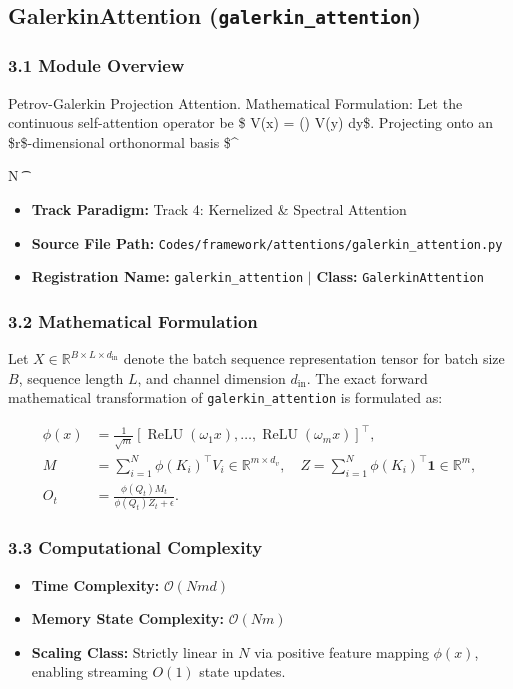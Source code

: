 \subsection{GalerkinAttention (\texttt{galerkin\_attention})}
\label{sec:app_module_galerkin_attention}

\subsubsection*{3.1 Module Overview}
Petrov-Galerkin Projection Attention.  Mathematical Formulation:     Let the continuous self-attention operator be \$ V(x) = \int {}\left(\right) V(y) dy\$.     Projecting onto an \$r\$-dimensional orthonormal basis \$\Phi \in {}^{N \t
\begin{itemize}
    \item \textbf{Track Paradigm:} Track 4: Kernelized & Spectral Attention
    \item \textbf{Source File Path:} \texttt{Codes/framework/attentions/galerkin\_attention.py}
    \item \textbf{Registration Name:} \texttt{galerkin\_attention} $\mid$ \textbf{Class:} \texttt{GalerkinAttention}
\end{itemize}

\subsubsection*{3.2 Mathematical Formulation}
Let $X \in \mathbb{R}^{B \times L \times d_{\text{in}}}$ denote the batch sequence representation tensor for batch size $B$, sequence length $L$, and channel dimension $d_{\text{in}}$. The exact forward mathematical transformation of \texttt{galerkin\_attention} is formulated as:

\begin{align}
\phi(x) &= \frac{1}{\sqrt{m}} \left[ \operatorname{ReLU}(\omega_1 x), \dots, \operatorname{ReLU}(\omega_m x) \right]^\top, \\
M &= \sum_{i=1}^N \phi(K_i)^\top V_i \in \mathbb{R}^{m \times d_v}, \quad Z = \sum_{i=1}^N \phi(K_i)^\top \mathbf{1} \in \mathbb{R}^m, \\
O_t &= \frac{\phi(Q_t) M_t}{\phi(Q_t) Z_t + \epsilon}.
\end{align}


\subsubsection*{3.3 Computational Complexity}
\begin{itemize}
    \item \textbf{Time Complexity:} $\mathcal{O}(N m d)$
    \item \textbf{Memory State Complexity:} $\mathcal{O}(N m)$
    \item \textbf{Scaling Class:} Strictly linear in $N$ via positive feature mapping $\phi(x)$, enabling streaming $O(1)$ state updates.
\end{itemize}

}
